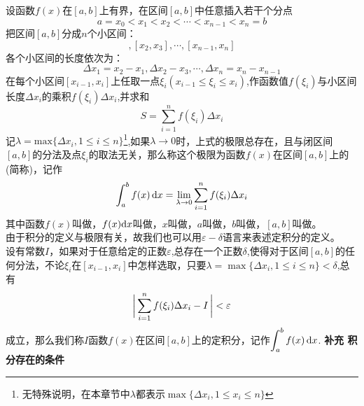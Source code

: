 \sj
{}
设函数$f(x)$在$[a,b]$上有界，在区间$[a,b]$中任意插入若干个分点
\begin{equation}
	\nonumber
	a=x_0<x_1<x_2<\cdots<x_{n-1}<x_n=b
\end{equation}
把区间$[a,b]$分成$n$个小区间：
\begin{equation}
	[x_1,x_2],[x_2,x_3],\cdots,[x_{n-1},x_n]
\end{equation}
各个小区间的长度依次为：
\begin{equation}
	\nonumber
	\Delta x_1=x_2-x_1,\Delta x_2-x_3,\cdots,\Delta x_n=x_n-x_{n-1}
\end{equation}
在每个小区间$[x_{i-1},x_i]$上任取一点$\xi_i(x_{i-1}\leq \xi_i\leq x_i)$,作函数值$f(\xi_i)$与小区间长度$\Delta x_i$的乘积$f(\xi_i)\Delta x_i$,并求和
\begin{equation}
	S=\sum_{i=1}^{n}f(\xi_i)\Delta x_i
\end{equation}
\kg 记$\lambda=\text{max}\{\Delta x_i,1\leq i\leq n\}$\footnote{无特殊说明，在本章节中$\lambda$都表示$\max \{\Delta x_i,1\leq x_i\leq n\}$},如果$\lambda\to 0$时，上式的极限总存在，且与闭区间$[a,b]$的分法及点$\xi_i$的取法无关，那么称这个极限为函数$f(x)$在区间$[a,b]$上的(简称)，记作
\begin{equation}
	\int_{a}^{b}f(x)\,{\rm{d}} x=\lim\limits_{\lambda\to0}\sum_{i=1}^{n}f(\xi_i)\Delta x_i
\end{equation}
\kg 其中函数$f(x)$叫做，$f(x){\rm{d}} x$叫做，$x$叫做，$a$叫做，$b$叫做，$[a,b]$叫做。\\
\kg 由于积分的定义与极限有关，故我们也可以用$\varepsilon-\delta$语言来表述定积分的定义。
\\ \kg 设有常数$I$，如果对于任意给定的正数$\varepsilon$,总存在一个正数$\delta$,使得对于区间$[a,b]$的任何分法，不论$\xi_i$在$[x_{i-1},x_i]$中怎样选取，只要$\lambda=\max\{\Delta x_i,1\leq i\leq n\}<\delta$,总有
\begin{equation}
	\bigg|\sum_{i=1}^{n}f(\xi_i)\Delta x_i-I \,\bigg|<\varepsilon\sj
\end{equation}
\noindent 成立，那么我们称$I$函数$f(x)$在区间$[a,b]$上的定积分，记作$\displaystyle\int_{a}^{b}f(x)\,{\rm{d}} x$.
\warn[\kg 定积分的值只与被积函数和被积区间有关，而与积分变量的记法无关。例如
\begin{equation}
	\int_{a}^{b}f(x) \,\d x=\int_{a}^{b}f(t) \,\d t=\int_{a}^{b}f(u) \,\d u\sj
	\end{equation}
\kg $\di\sum_{i=1}^{n}f(\xi_i)\Delta x_i$通常称为$f(x)$的积分和。如果$f(x)$在{$[a,b]$}上的定积分存在，那么就称$f(x)$在{$[a,b]$}上可积。]
\noindent \textbf{补充\hspace{1em} 积分存在的条件}\\

